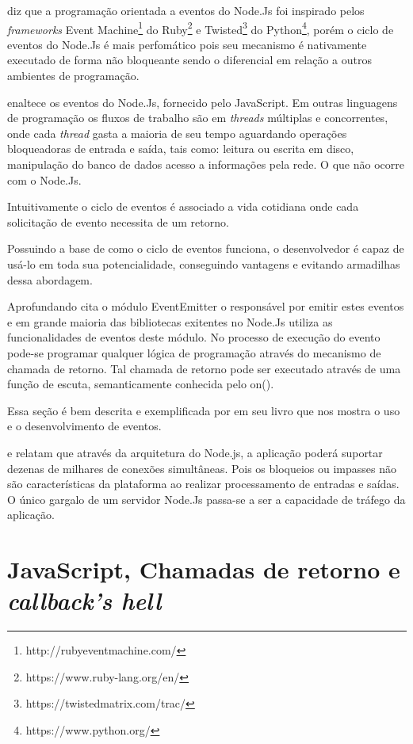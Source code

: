   \cite{Pereira:2013} diz que a programação orientada a eventos do Node.Js 
  foi inspirado pelos \textit{frameworks} Event Machine\footnote{http://rubyeventmachine.com/} do 
  Ruby\footnote{https://www.ruby-lang.org/en/} e Twisted\footnote{https://twistedmatrix.com/trac/} do 
  Python\footnote{https://www.python.org/}, porém o ciclo de eventos do Node.Js é mais perfomático pois seu mecanismo 
  é nativamente executado de forma não bloqueante sendo o diferencial em relação a outros ambientes de programação.
  
  \cite{Wilson:2013} enaltece os eventos do Node.Js, fornecido pelo JavaScript. Em outras linguagens de programação 
  os fluxos de trabalho são em \textit{threads} múltiplas e concorrentes, onde cada \textit{thread} gasta a maioria de seu tempo aguardando 
  operações bloqueadoras de entrada e saída, tais como: leitura ou escrita em disco, manipulação do banco de dados 
  acesso a informações pela rede. O que não ocorre com o Node.Js.
   
  Intuitivamente o ciclo de eventos é associado a vida cotidiana onde cada solicitação de evento necessita de um retorno.
  
  Possuindo a base de como o ciclo de eventos funciona, o desenvolvedor é capaz de usá-lo em toda sua potencialidade, 
  conseguindo vantagens e evitando armadilhas dessa abordagem.\cite{Hughes:2012}
  
  Aprofundando \cite{Pereira:2013} cita o módulo EventEmitter o responsável por emitir estes eventos e em 
  grande maioria das bibliotecas exitentes no Node.Js utiliza as funcionalidades de eventos deste módulo. 
  No processo de execução do evento pode-se programar qualquer lógica de programação através do 
  mecanismo de chamada de retorno. Tal chamada de retorno pode ser executado através de uma função de escuta, 
  semanticamente conhecida pelo on().
  
  Essa seção é bem descrita e exemplificada por \cite{Wilson:2013} em seu livro que nos mostra o uso e o 
  desenvolvimento de eventos.

   e  relatam que através da arquitetura do Node.js, a aplicação poderá 
  suportar dezenas de milhares de conexões simultâneas. Pois os bloqueios ou impasses não são características da plataforma ao
  realizar processamento de entradas e saídas. O único gargalo de um servidor Node.Js passa-se a ser a capacidade de 
  tráfego da aplicação.
  
\section{JavaScript, Chamadas de retorno e \textit{callback's hell}}
\label{chamadas-de-retorno-e-callback-hell}

